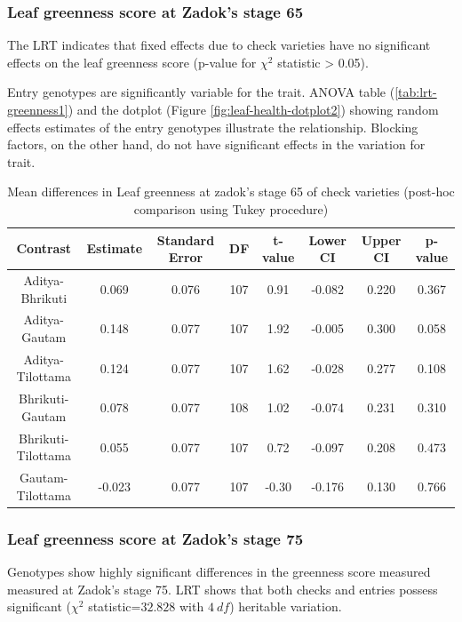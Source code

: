 \documentclass[12pt,oneside]{dukestatscithesis} %
\theoremstyle{definition}
\theoremstyle{definition}
\theoremstyle{definition}
\theoremstyle{remark}
\begin{document}
\subsubsection{Leaf greenness score at Zadok's stage
65}\label{leaf-greenness-score-at-zadoks-stage-65}

The LRT indicates that fixed effects due to check varieties have no
significant effects on the leaf greenness score (p-value for \(\chi^2\)
statistic \textgreater{} 0.05).

Entry genotypes are significantly variable for the trait. ANOVA table
(\ref{tab:lrt-greenness1}) and the dotplot (Figure
\ref{fig:leaf-health-dotplot2}) showing random effects estimates of the
entry genotypes illustrate the relationship. Blocking factors, on the
other hand, do not have significant effects in the variation for trait.
\begin{table}[H]

\caption{\label{tab:leaf-health-meanconf-tab2}Mean differences in Leaf greenness at zadok's stage 65 of check varieties (post-hoc comparison using Tukey procedure)}
\centering
\begin{tabular}[t]{cccccccc}
\toprule
Contrast & Estimate & Standard Error & DF & t-value & Lower CI & Upper CI & p-value\\
\midrule
Aditya-Bhrikuti & 0.069 & 0.076 & 107 & 0.91 & -0.082 & 0.220 & 0.367\\
Aditya-Gautam & 0.148 & 0.077 & 107 & 1.92 & -0.005 & 0.300 & 0.058\\
Aditya-Tilottama & 0.124 & 0.077 & 107 & 1.62 & -0.028 & 0.277 & 0.108\\
Bhrikuti-Gautam & 0.078 & 0.077 & 108 & 1.02 & -0.074 & 0.231 & 0.310\\
Bhrikuti-Tilottama & 0.055 & 0.077 & 107 & 0.72 & -0.097 & 0.208 & 0.473\\
Gautam-Tilottama & -0.023 & 0.077 & 107 & -0.30 & -0.176 & 0.130 & 0.766\\
\bottomrule
\end{tabular}
\end{table}
\subsubsection{Leaf greenness score at Zadok's stage
75}\label{leaf-greenness-score-at-zadoks-stage-75}

Genotypes show highly significant differences in the greenness score
measured measured at Zadok's stage 75. LRT shows that both checks and
entries possess significant (\(\chi^2\) statistic=\(32.828\) with
\(4\ df\)) heritable variation.
\end{document}
